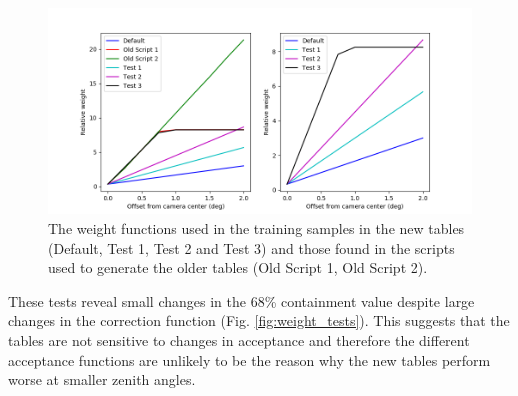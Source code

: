\documentclass[main.tex]{subfiles}
\begin{document}
\begin{figure}[htbp]
  \centering
  \includegraphics[width=.78\linewidth]{images/weights}
  \caption[Weight functions for offset from camera center.]{The weight functions used in the training samples in the new tables (Default, Test 1, Test 2 and Test 3) and those found in the scripts used to generate the older tables (Old Script 1, Old Script 2).}
  \label{fig:weights}
\end{figure}

These tests reveal small changes in the 68\% containment value despite large changes in the correction function (Fig. \ref{fig:weight_tests}). This suggests that the \disp tables are not sensitive to changes in acceptance and therefore the different acceptance functions are unlikely to be the reason why the new \disp tables perform worse at smaller zenith angles.
\end{document}
